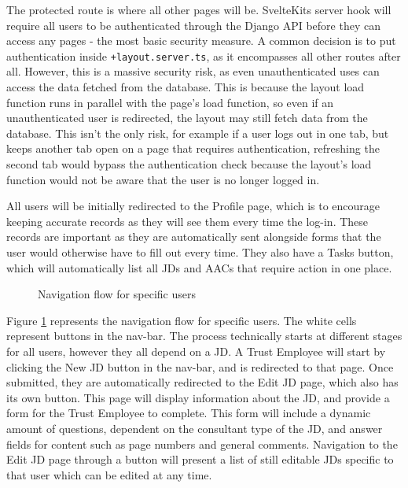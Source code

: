 The protected route is where all other pages will be. SvelteKits server hook will require all users to be authenticated through the Django API before they can access any pages - the most basic security measure. A common decision is to put authentication inside \texttt{+layout.server.ts}, as it encompasses all other routes after all. However, this is a massive security risk, as even unauthenticated uses can access the data fetched from the database. This is because the layout load function runs in parallel with the page's load function, so even if an unauthenticated user is redirected, the layout may still fetch data from the database. This isn't the only risk, for example if a user logs out in one tab, but keeps another tab open on a page that requires authentication, refreshing the second tab would bypass the authentication check because the layout's load function would not be aware that the user is no longer logged in.

All users will be initially redirected to the Profile page, which is to encourage keeping accurate records as they will see them every time the log-in. These records are important as they are automatically sent alongside forms that the user would otherwise have to fill out every time. They also have a Tasks button, which will automatically list all JDs and AACs that require action in one place.

\begin{figure}[h]
\centering
{}
\vspace{-5pt}
\caption{Navigation flow for specific users}
\label{fig:ui-role}
\vspace{-5pt}
\end{figure}

Figure \ref{fig:ui-role} represents the navigation flow for specific users. The white cells represent buttons in the nav-bar. The process technically starts at different stages for all users, however they all depend on a JD. A Trust Employee will start by clicking the New JD button in the nav-bar, and is redirected to that page. Once submitted, they are automatically redirected to the Edit JD page, which also has its own button. This page will display information about the JD, and provide a form for the Trust Employee to complete. This form will include a dynamic amount of questions, dependent on the consultant type of the JD, and answer fields for content such as page numbers and general comments. Navigation to the Edit JD page through a button will present a list of still editable JDs specific to that user which can be edited at any time.

